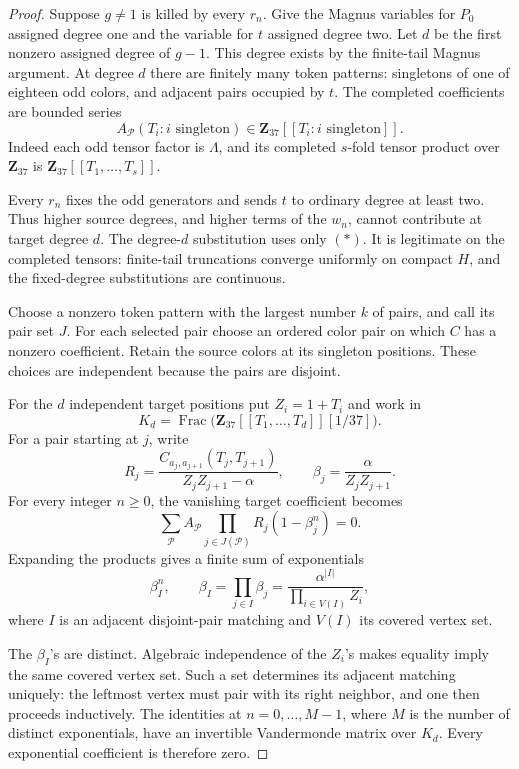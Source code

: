 \documentclass[11pt]{article}
\theoremstyle{definition}\newtheorem{definition}[theorem]{Definition}
\begin{document}
\begin{proof}
Suppose \(g\ne1\) is killed by every \(r_n\).
Give the Magnus variables for \(P_0\) assigned degree one
and the variable for \(t\) assigned degree two.
Let \(d\) be the first nonzero assigned degree of \(g-1\).
This degree exists by the finite-tail Magnus argument.
At degree \(d\) there are finitely many token patterns:
singletons of one of eighteen odd colors, and adjacent
pairs occupied by \(t\). The completed coefficients are
bounded series
\[
 A_{\mathcal P}(T_i:i\text{ singleton})
 \in\mathbf Z_{37}[[T_i:i\text{ singleton}]].
\]
Indeed each odd tensor factor is \(\Lambda\), and its
completed \(s\)-fold tensor product over \(\mathbf Z_{37}\)
is \(\mathbf Z_{37}[[T_1,\ldots,T_s]]\).

Every \(r_n\) fixes the odd generators and sends \(t\) to
ordinary degree at least two. Thus higher source degrees,
and higher terms of the \(w_n\), cannot contribute at
target degree \(d\). The degree-\(d\) substitution uses only
\((*)\). It is legitimate on the completed tensors:
finite-tail truncations converge uniformly on compact
\(H\), and the fixed-degree substitutions are continuous.

Choose a nonzero token pattern with the largest number
\(k\) of pairs, and call its pair set \(J\).
For each selected pair choose an ordered color pair on
which \(C\) has a nonzero coefficient. Retain the source
colors at its singleton positions. These choices are
independent because the pairs are disjoint.

For the \(d\) independent target positions put \(Z_i=1+T_i\)
and work in
\[
 K_d=\operatorname{Frac}
       \bigl(\mathbf Z_{37}[[T_1,\ldots,T_d]][1/37]\bigr).
\]
For a pair starting at \(j\), write
\[
 R_j=\frac{C_{a_j,a_{j+1}}(T_j,T_{j+1})}
              {Z_jZ_{j+1}-\alpha},
 \qquad \beta_j=\frac{\alpha}{Z_jZ_{j+1}}.
\]
For every integer \(n\ge0\), the vanishing target coefficient
becomes
\[
 \sum_{\mathcal P}A_{\mathcal P}
   \prod_{j\in J(\mathcal P)}R_j(1-\beta_j^n)=0.
\]
Expanding the products gives a finite sum of exponentials
\[
 \beta_I^n,\qquad
 \beta_I=\prod_{j\in I}\beta_j
    =\frac{\alpha^{|I|}}{\prod_{i\in V(I)}Z_i},
\]
where \(I\) is an adjacent disjoint-pair matching and
\(V(I)\) its covered vertex set.

The \(\beta_I\)'s are distinct. Algebraic independence of
the \(Z_i\)'s makes equality imply the same covered vertex
set. Such a set determines its adjacent matching uniquely:
the leftmost vertex must pair with its right neighbor,
and one then proceeds inductively. The identities at
\(n=0,\ldots,M-1\), where \(M\) is the number of distinct
exponentials, have an invertible Vandermonde matrix over
\(K_d\). Every exponential coefficient is therefore zero.


\end{proof}
\end{document}
